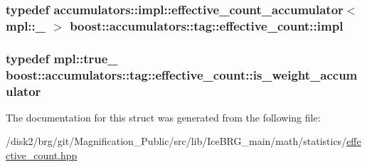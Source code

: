 \subsubsection[{impl}]{\setlength{\rightskip}{0pt plus 5cm}typedef {\bf accumulators\+::impl\+::effective\+\_\+count\+\_\+accumulator}$<$ mpl\+::\+\_ $>$ {\bf boost\+::accumulators\+::tag\+::effective\+\_\+count\+::impl}}\label{structboost_1_1accumulators_1_1tag_1_1effective__count_afb8cd525da641f5b3f81759f2c614350}
\hypertarget{structboost_1_1accumulators_1_1tag_1_1effective__count_ac4274fac6b1cf2217291494cd34d67d2}{}
\subsubsection[{is\+\_\+weight\+\_\+accumulator}]{\setlength{\rightskip}{0pt plus 5cm}typedef mpl\+::true\+\_\+ {\bf boost\+::accumulators\+::tag\+::effective\+\_\+count\+::is\+\_\+weight\+\_\+accumulator}}\label{structboost_1_1accumulators_1_1tag_1_1effective__count_ac4274fac6b1cf2217291494cd34d67d2}


The documentation for this struct was generated from the following file\+:\begin{DoxyCompactItemize}
\item 
/disk2/brg/git/\+Magnification\+\_\+\+Public/src/lib/\+Ice\+B\+R\+G\+\_\+main/math/statistics/\hyperlink{effective__count_8hpp}{effective\+\_\+count.\+hpp}\end{DoxyCompactItemize}
